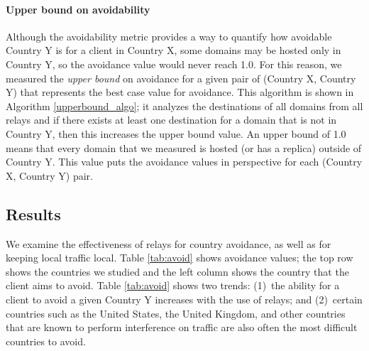 \paragraph{Upper bound on avoidability}  Although the avoidability metric
provides a way to quantify how avoidable Country Y is for a client in Country
X, some domains may be hosted only in Country Y, so the avoidance value  would
never reach 1.0.  For this reason, we measured the {\em upper bound} on
avoidance for a given pair of (Country X, Country Y) that represents the best
case value for avoidance.  This algorithm is shown in Algorithm \ref{upperbound_algo}; it analyzes the destinations of all
domains from all relays and if there exists at least one destination for a
domain that is not in Country Y, then this increases the upper bound value. An
upper bound of 1.0 means that every domain that we measured is hosted (or has
a replica) outside of Country Y.  This value puts the avoidance values in
perspective for each (Country X, Country Y) pair.

\subsection{Results}

We examine the
effectiveness of relays for country avoidance, as well as for keeping local
traffic local.  Table \ref{tab:avoid} shows avoidance values; the top
row shows the countries we studied and the left column shows the country
that the client aims to avoid.
%
Table \ref{tab:avoid} shows two trends: (1)~the ability
for a client to avoid a given Country Y increases with the use of relays; and (2)~certain
countries such as the United States, the United Kingdom, and other countries that
are known to perform interference on traffic are also often the most difficult countries
to avoid.

